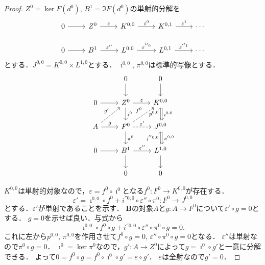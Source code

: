 \begin{proof}
  \(Z^0 = \ker F(d^0)\), \(B^1 = \Im F(d^0)\)の単射的分解を
  \[
  \begin{tikzcd}
    0 \arrow[r] & Z^0 \arrow[r, "\varepsilon"] & K^{0, 0} \arrow[r, "\varepsilon^0"] & K^{0, 1} \arrow[r, "\varepsilon^1"] & \cdots \\
    0 \arrow[r] & B^1 \arrow[r, "\varepsilon''"] & L^{0, 0} \arrow[r, "\varepsilon^{''0}"] & L^{0, 1} \arrow[r, "\varepsilon^{''1}"] & \cdots
  \end{tikzcd}
  \]
  とする．\(J^{0, 0} = K^{0, 0} \times L^{1, 0}\)とする．
  \(\imath^{0, 0}\), \(\pi^{0, 0}\)は標準的写像とする．
  \[
  \begin{tikzcd}
    & 0 \arrow[d] & 0 \arrow[d] \\
    0 \arrow[r] & Z^0 \arrow[r, "\varepsilon"]\arrow[d, "\imath^0"] & K^{0, 0} \arrow[d, "\imath^{0, 0}", shift left] \\
    A \arrow[r, "g"]\arrow[ru, "g'", dashed] & F^0 \arrow[r, "\varepsilon'", dashed]\arrow[d, "\pi^0"]\arrow[ru, "f^0", dashed] & J^{0, 0} \arrow[d, "\pi^{0, 0}", shift left]\arrow[u, "p^{0, 0}"] \\
    0 \arrow[r] & B^1 \arrow[r, "\varepsilon''"]\arrow[d] & L^{1, 0} \arrow[d]\arrow[u, "i^{''0, 0}"] \\
    & 0 & 0
  \end{tikzcd}
  \]

  \(K^{0, 0}\)は単射的対象なので，\(\varepsilon = f^0 \circ \imath^0\)となる\(f^0\colon F^0 \to K^{0, 0}\)が存在する．
  \[ \varepsilon' = \imath^{0, 0} \circ f^0 + i^{''0, 0} \circ \varepsilon'' \circ \pi^0 \colon F^0 \to J^{0, 0} \]
  とする．\(\varepsilon'\)が単射であることを示す．
  \(\boldsymbol{B}\)の対象\(A\)と\(g\colon A\to F^0\)について\(\varepsilon'\circ g = 0\)とする．
  \(g=0\)を示せば良い．与式から
  \[ \imath^{0, 0} \circ f^0 \circ g + i^{''0, 0} \circ \varepsilon'' \circ \pi^0 \circ g = 0 . \]
  これに左から\(p^{0, 0}\), \(\pi^{0, 0}\)を作用させて\(f^0 \circ g = 0\), \(\varepsilon'' \circ \pi^0 \circ g = 0\)となる．
  \(\varepsilon''\)は単射なので\(\pi^0 \circ g = 0\)．
  \(\imath^0 = \ker\pi^0\)なので，\(g'\colon A \to Z^0\)によって\(g = \imath^0 \circ g'\)と一意に分解できる．
  よって\(0 = f^0 \circ g = f^0 \circ \imath^0 \circ g' = \varepsilon \circ g'\)．
  \(\varepsilon\)は全射なので\(g'=0\)．


\end{proof}
